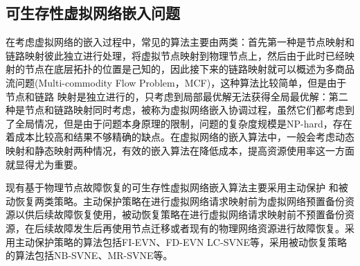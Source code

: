 

\subsection{可生存性虚拟网络嵌入问题}
在考虑虚拟网络的嵌入过程中，常见的算法主要由两类：首先第一种是节点映射和链路映射彼此独立进行处理，将虚拟节点映射到物理节点上，然后由于此时已经映射的节点在底层拓扑的位置是己知的，因此接下来的链路映射就可以概述为多商品流问题\cite{even1975complexity}(Multi-commodity Flow Problem，MCF)，这种算法比较简单，但是由于节点和链路 映射是独立进行的，只考虑到局部最优解无法获得全局最优解：第二种是节点和链路映射同时考虑，被称为虚拟网络嵌入协调过程，虽然它们都考虑到了全局情况，但是由于问题本身原理的限制，问题的复杂度规模是NP-hard，存在着成本比较高和结果不够精确的缺点。在虚拟网络的嵌入算法中，一般会考虑动态映射和静态映射两种情况\cite{fischer2013virtual}，有效的嵌入算法在降低成本，提高资源使用率这一方面就显得尤为重要。



现有基于物理节点故障恢复的可生存性虚拟网络嵌入算法主要采用主动保护\cite{yu2011cost} 和被动恢复\cite{rahman2010survivable}两类策略。主动保护策略在进行虚拟网络请求映射前为虚拟网络预置备份资源以供后续故障恢复使用，被动恢复策略在进行虚拟网络请求映射前不预置备份资源，在后续故障发生后再使用节点迁移或者现有的物理网络资源进行故障恢复。采用主动保护策略的算法包括FI-EVN\cite{yu2011cost}、FD-EVN\cite{wang2014survivable} LC-SVNE\cite{hu2012location}等，采用被动恢复策略的算法包括NB-SVNE\cite{bo2014dynamic}、MR-SVNE\cite{qiang2014heuristic}等。

